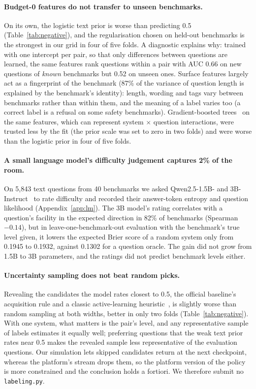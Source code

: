 \documentclass{article}
\newcommand{\code}[1]{\texttt{#1}}
\begin{document}
\paragraph{Budget-0 features do not transfer to unseen benchmarks.} On its own, the logistic text prior is worse than predicting 0.5 (Table~\ref{tab:negative}), and the regularisation chosen on held-out benchmarks is the strongest in our grid in four of five folds. A diagnostic explains why: trained with one intercept per pair, so that only differences between questions are learned, the same features rank questions within a pair with AUC 0.66 on new questions of \emph{known} benchmarks but 0.52 on unseen ones. Surface features largely act as a fingerprint of the benchmark (87\% of the variance of question length is explained by the benchmark's identity): length, wording and tags vary between benchmarks rather than within them, and the meaning of a label varies too (a correct label is a refusal on some safety benchmarks). Gradient-boosted trees~\citep{ke2017} on the same features, which can represent system $\times$ question interactions, were trusted less by the fit (the prior scale was set to zero in two folds) and were worse than the logistic prior in four of five folds.

\paragraph{A small language model's difficulty judgement captures 2\% of the room.} On 5{,}843 text questions from 40 benchmarks we asked Qwen2.5-1.5B- and 3B-Instruct~\citep{qwen2024} to rate difficulty and recorded their answer-token entropy and question likelihood (Appendix~\ref{app:lm}). The 3B model's rating correlates with a question's facility in the expected direction in 82\% of benchmarks (Spearman $-0.14$), but in leave-one-benchmark-out evaluation with the benchmark's true level given, it lowers the expected Brier score of a random system only from 0.1945 to 0.1932, against 0.1302 for a question oracle. The gain did not grow from 1.5B to 3B parameters, and the ratings did not predict benchmark levels either.

\paragraph{Uncertainty sampling does not beat random picks.} Revealing the candidates the model rates closest to 0.5, the official baseline's acquisition rule and a classic active-learning heuristic~\citep{settles2009}, is slightly worse than random sampling at both widths, better in only two folds (Table~\ref{tab:negative}). With one system, what matters is the pair's level, and any representative sample of labels estimates it equally well; preferring questions that the weak text prior rates near 0.5 makes the revealed sample less representative of the evaluation questions. Our simulation lets skipped candidates return at the next checkpoint, whereas the platform's stream drops them, so the platform version of the policy is more constrained and the conclusion holds a fortiori. We therefore submit no \code{labeling.py}.
\end{document}
